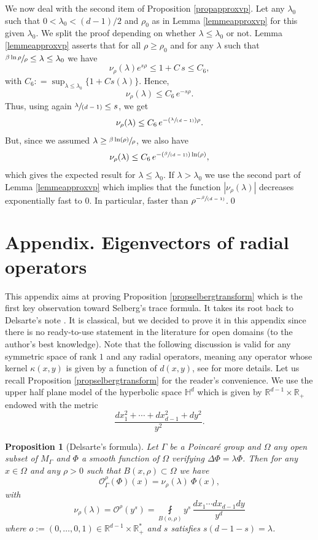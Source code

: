 \documentclass[10pt]{amsart}
\let\mathcal\mathscr
\newcommand{\Pspfrac}[2]{(\sfrac{#1}{(#2)})}
\newcommand{\spfrac}[2]{\sfrac{#1}{(#2)}}
\theoremstyle{plain}
\newtheorem{proposition}[equation]{Proposition}
\theoremstyle{definition}
\newcommand{\RR}{\mathbb{R}}
\newcommand{\finte}[3]{\underset{#1}{\fint} {#2} \, {#3}}
\begin{document}
We now deal with the second item of Proposition \ref{propapproxvp}. Let any $\lambda_0$ such that \hbox{$0 < \lambda_0 < (d-1)/2$} and $\rho_0$ as in Lemma \ref{lemmeapproxvp} for this given $\lambda_0$. We split the proof depending on whether $\lambda \le \lambda_0$ or not. Lemma \ref{lemmeapproxvp} asserts that for all $\rho \ge \rho_0$ and for any $\lambda$ such that $\sfrac{\beta \ln \rho}{\rho} \le \lambda \le \lambda_0$ we have
\[
\nu_{\rho}(\lambda) e^{s \rho} \le 1 + C \, s \le C_6,
\]
with $C_6 : = \sup_{\lambda \le \lambda_0} \{ 1 + C s(\lambda) \}$. Hence,
\[
\nu_{\rho}(\lambda) \le C_6 \, e^{-s \rho}.
\]
Thus, using again $ \spfrac{\lambda}{d-1} \le s$, we get
\[
\nu_{\rho}(\lambda) \le C_6 \, e^{- \Pspfrac{\lambda}{d-1} \rho}.
\]
But, since we assumed $\lambda \ge \sfrac{\beta \ln(\rho) }{\rho}$, we also have
\[
\nu_{\rho}(\lambda) \le C_6 \, e^{- \Pspfrac{\beta}{d-1} \ln(\rho)},
\]
which gives the expected result for $\lambda \le \lambda_0$. If $\lambda > \lambda_0$ we use the second part of Lemma \ref{lemmeapproxvp} which implies that the function $|\nu_{\rho}(\lambda)|$ decreases exponentially fast to $0$. In particular, faster than $\rho^{-\spfrac{\beta}{d-1}}$.\qed

\appendix
{}
\section*{Appendix. Eigenvectors of radial operators}
\label{secselbergspretrace}
This appendix aims at proving Proposition \ref{propselbergtransform} which is the first key observation toward Selberg's trace formula. It takes its root back to Delsarte's note \cite{artdelsarte}. It is classical, but we decided to prove it in this appendix since there is no ready-to-use statement in the literature for open domains (to the author's best knowledge). Note that the following discussion is valid for any symmetric space of rank $1$ and any radial operators, meaning any operator whose kernel $\kappa(x,y)$ is given by a function of $d(x,y)$, see \cite[Chap.\,11]{livrechavel} for more details. Let us recall Proposition \ref{propselbergtransform} for the reader's convenience. We use the upper half plane model of the hyperbolic space $\mathbb{H}^d$ which is given by $\RR^{d-1} \times \RR_+$ endowed with the metric
\[
\frac{dx^2_1 +\cdots + dx^2_{d-1} + dy^2}{y^{2}}.
\]

\begin{proposition}[Delsarte's formula]
Let $\Gamma$ be a Poincaré group and $\Omega$ any open subset of $M_{\Gamma}$ and $\Phi$ a smooth function of $\Omega$ verifying $\Delta \Phi = \lambda \Phi$. Then for any $x \in \Omega$ and any $\rho > 0$ such that $B(x,\rho) \subset \Omega$ we have
\begin{equation*}
\mathcal{O}_{\Gamma}^{\rho}(\Phi)(x) = \nu_{\rho}(\lambda) \ \Phi(x),
\end{equation*}
with
\begin{equation*}
\nu_{\rho}(\lambda) = \mathcal{O}^{\rho}(y^s) = \finte{B(o,\rho)} { y^s}{ \frac{dx_1\cdots dx_{d-1} dy}{y^d}}
\end{equation*}
where $o := (0,\dots, 0, 1) \in \RR^{d-1} \times \RR_+^*$ and $s$ satisfies $s(d-1-s) = \lambda$.
\end{proposition}
\end{document}
